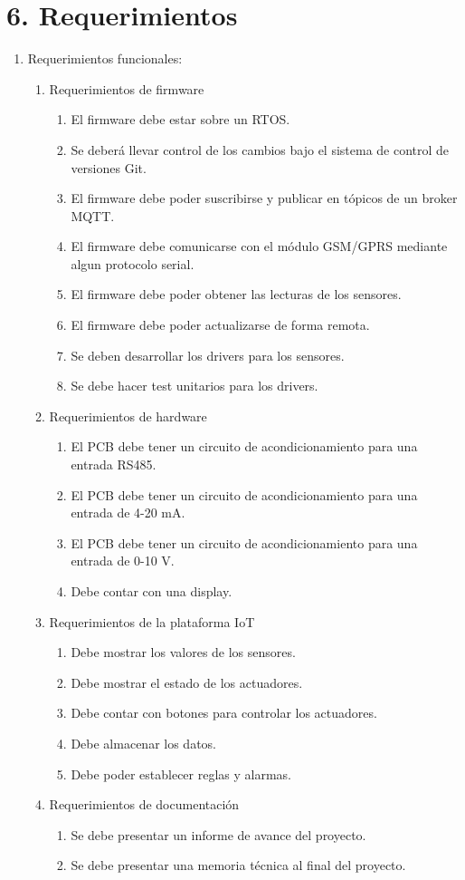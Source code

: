 \documentclass[
11pt, %
codirector, %
]{charter}
\begin{document}
\section{6. Requerimientos}
\label{sec:requerimientos}
\begin{enumerate}
	\item Requerimientos funcionales:
		\begin{enumerate}
			\item Requerimientos de firmware
			\begin{enumerate} 
				\item El firmware debe estar sobre un RTOS.
				\item Se deberá llevar control de los cambios bajo el sistema de control de versiones Git.
				\item El firmware debe poder suscribirse y publicar en tópicos de un broker MQTT.
				\item El firmware debe comunicarse con el módulo GSM/GPRS mediante algun protocolo serial.
				\item El firmware debe poder obtener las lecturas de los sensores.
				\item El firmware debe poder actualizarse de forma remota.
				\item Se deben desarrollar los drivers para los sensores.
				\item Se debe hacer test unitarios para los drivers.
			\end{enumerate}
			\item Requerimientos de hardware
			\begin{enumerate} 
				\item El PCB debe tener un circuito de acondicionamiento para una entrada RS485.
				\item El PCB debe tener un circuito de acondicionamiento para una entrada de 4-20 mA.
				\item El PCB debe tener un circuito de acondicionamiento para una entrada de 0-10 V.
				\item Debe contar con una display.
			\end{enumerate}			
			\item Requerimientos de la plataforma IoT
			\begin{enumerate} 
				\item Debe mostrar los valores de los sensores.
				\item Debe mostrar el estado de los actuadores.
				\item Debe contar con botones para controlar los actuadores.
				\item Debe almacenar los datos.
				\item Debe poder establecer reglas y alarmas. 
			\end{enumerate}
			\item Requerimientos de documentación
			\begin{enumerate} 
				\item Se debe presentar un informe de avance del proyecto.
				\item Se debe presentar una memoria técnica al final del proyecto.
			\end{enumerate}
		\end{enumerate}


\end{enumerate}
\end{document}
